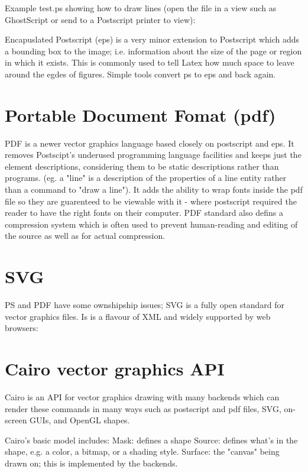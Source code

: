 \documentclass[oneside,english]{scrbook}
\begin{document}
Example test.ps showing how to draw lines (open the file in a view such as GhostScript or send to a Postscript printer to view):


Encapuslated Postscript (eps) is a very minor extension to Postscript which adds a bounding box to the image; i.e. information about the size of the page or region in which it exists. This is commonly used to tell Latex how much space to leave around the egdes of figures. Simple tools convert ps to eps and back again.


\section{Portable Document Fomat (pdf)}

PDF is a newer vector graphics language based closely on postscript and eps.  It removes Postscipt's underused programming language facilities and keeps just the element descriptions, considering them to be static descriptions rather than programs.  (eg. a "line" is a description of the properties of a line entity rather than a command to "draw a line").  It adds the ability to wrap fonts inside the pdf file so they are guarenteed to be viewable with it - where postscript required the reader to have the right fonts on their computer.  PDF standard also defins a compression system which is often used to prevent human-reading and editing of the source as well as for actual compression.




\section{SVG}
PS and PDF have some ownshipship issues; SVG is a fully open standard for vector graphics files. Is is a flavour of XML and widely supported by web browsers:



\section{Cairo vector graphics API}

Cairo is an API for vector graphics drawing with many backends which can render these commands in many ways such as postscript and pdf files, SVG, on-screen GUIs, and OpenGL shapes.

Cairo's basic model includes:
Mask: defines a shape
Source: defines what's in the shape, e.g. a color, a bitmap, or a shading style.
Surface: the "canvas" being drawn on; this is implemented by the backends.
\end{document}

